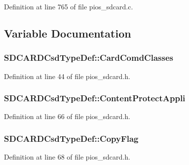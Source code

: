 Definition at line 765 of file pios\-\_\-sdcard.\-c.



\subsection{Variable Documentation}
\hypertarget{group___p_i_o_s___s_d_c_a_r_d_ga6684006d87c1e8fda9008685fd83698b}{
\subsubsection[{Card\-Comd\-Classes}]{ S\-D\-C\-A\-R\-D\-Csd\-Type\-Def\-::\-Card\-Comd\-Classes}}\label{group___p_i_o_s___s_d_c_a_r_d_ga6684006d87c1e8fda9008685fd83698b}


Definition at line 44 of file pios\-\_\-sdcard.\-h.

\hypertarget{group___p_i_o_s___s_d_c_a_r_d_ga0ff4eb4714ed988bfe5d6418f553dee3}{
\subsubsection[{Content\-Protect\-Appli}]{ S\-D\-C\-A\-R\-D\-Csd\-Type\-Def\-::\-Content\-Protect\-Appli}}\label{group___p_i_o_s___s_d_c_a_r_d_ga0ff4eb4714ed988bfe5d6418f553dee3}


Definition at line 66 of file pios\-\_\-sdcard.\-h.

\hypertarget{group___p_i_o_s___s_d_c_a_r_d_ga24efbbd2c557f214a8bfcec06ce30d19}{
\subsubsection[{Copy\-Flag}]{ S\-D\-C\-A\-R\-D\-Csd\-Type\-Def\-::\-Copy\-Flag}}\label{group___p_i_o_s___s_d_c_a_r_d_ga24efbbd2c557f214a8bfcec06ce30d19}


Definition at line 68 of file pios\-\_\-sdcard.\-h.

